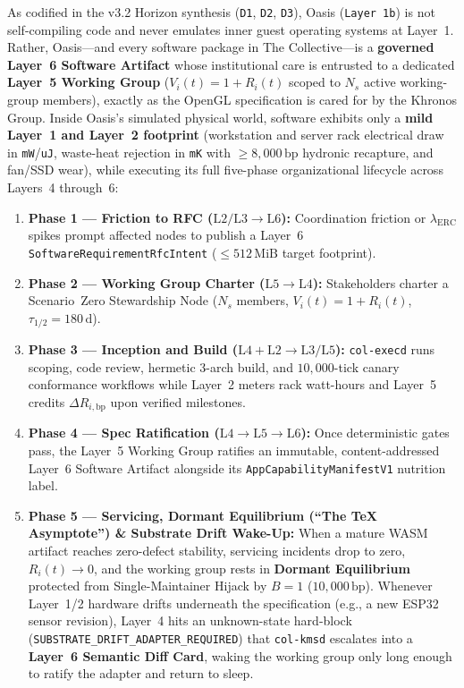 As codified in the v3.2 Horizon synthesis (\texttt{D1}, \texttt{D2}, \texttt{D3}), Oasis
(\texttt{Layer 1b}) is not self-compiling code and never emulates inner guest operating systems at
Layer~1. Rather, Oasis---and every software package in The Collective---is a \textbf{governed
Layer~6 Software Artifact} whose institutional care is entrusted to a dedicated \textbf{Layer~5
Working Group} ($V_i(t) = 1 + R_i(t)$ scoped to $N_s$ active working-group members), exactly as
the OpenGL specification is cared for by the Khronos Group. Inside Oasis's simulated physical
world, software exhibits only a \textbf{mild Layer~1 and Layer~2 footprint} (workstation and server
rack electrical draw in \texttt{mW}/\texttt{uJ}, waste-heat rejection in \texttt{mK} with
$\ge 8{,}000\,\mathrm{bp}$ hydronic recapture, and fan/SSD wear), while executing its full
five-phase organizational lifecycle across Layers~4 through~6:
\begin{enumerate}
\item \textbf{Phase 1 --- Friction to RFC ($\mathrm{L2/L3} \to \mathrm{L6}$):} Coordination friction
        or $\lambda_{\mathrm{ERC}}$ spikes prompt affected nodes to publish a Layer~6
        \texttt{SoftwareRequirementRfcIntent} ($\le 512\,\mathrm{MiB}$ target footprint).
\item \textbf{Phase 2 --- Working Group Charter ($\mathrm{L5} \to \mathrm{L4}$):} Stakeholders
        charter a Scenario~Zero Stewardship Node ($N_s$ members, $V_i(t) = 1 + R_i(t)$,
        $\tau_{1/2} = 180\,\mathrm{d}$).
\item \textbf{Phase 3 --- Inception and Build ($\mathrm{L4} + \mathrm{L2} \to \mathrm{L3/L5}$):}
        \texttt{col-execd} runs scoping, code review, hermetic 3-arch build, and $10{,}000$-tick
        canary conformance workflows while Layer~2 meters rack watt-hours and Layer~5 credits
        $\Delta R_{i,\mathrm{bp}}$ upon verified milestones.
\item \textbf{Phase 4 --- Spec Ratification ($\mathrm{L4} \to \mathrm{L5} \to \mathrm{L6}$):}
        Once deterministic gates pass, the Layer~5 Working Group ratifies an immutable,
        content-addressed Layer~6 Software Artifact alongside its \texttt{AppCapabilityManifestV1}
        nutrition label.
\item \textbf{Phase 5 --- Servicing, Dormant Equilibrium (``The \TeX{} Asymptote'') \& Substrate Drift Wake-Up:}
        When a mature WASM artifact reaches zero-defect stability, servicing incidents drop to
        zero, $R_i(t) \to 0$, and the working group rests in \textbf{Dormant Equilibrium} protected
        from Single-Maintainer Hijack by $B = 1$ ($10{,}000\,\mathrm{bp}$). Whenever Layer~1/2
        hardware drifts underneath the specification (e.g., a new ESP32 sensor revision), Layer~4
        hits an unknown-state hard-block (\texttt{SUBSTRATE\_DRIFT\_ADAPTER\_REQUIRED}) that
        \texttt{col-kmsd} escalates into a \textbf{Layer~6 Semantic Diff Card}, waking the working
        group only long enough to ratify the adapter and return to sleep.
\end{enumerate}

